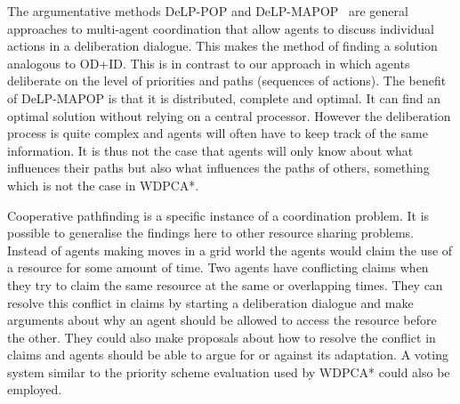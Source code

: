 The argumentative methods \textsf{DeLP-POP} and 
\textsf{DeLP-MAPOP}~\cite{pardo2011,ferrando2012} are 
general approaches to multi-agent coordination that allow agents to discuss 
individual actions in a deliberation dialogue. This makes the method of finding 
a solution analogous to OD+ID. This is in contrast to our approach in which 
agents deliberate on the level of priorities and paths (sequences of actions). 
The benefit of \textsf{DeLP-MAPOP} is that it is distributed, complete and 
optimal. It can find an optimal solution without relying on a central 
processor. However the deliberation process is quite complex and agents will 
often have to keep track of the same information. It is thus not the case that 
agents will only know about what influences their paths but also what 
influences the paths of others, something which is not the case in WDPCA*.





Cooperative pathfinding is a specific instance of a coordination problem. It is
possible to generalise the findings here to other resource sharing problems.
Instead of agents making moves in a grid world the agents would claim the use
of a resource for some amount of time. Two agents have conflicting claims when
they try to claim the same resource at the same or overlapping times. They can
resolve this conflict in claims by starting a deliberation dialogue and make
arguments about why an agent should be allowed to access the resource before
the other. They could also make proposals about how to resolve the conflict in
claims and agents should be able to argue for or against its adaptation. A
voting system similar to the priority scheme evaluation used by WDPCA* could
also be employed.


